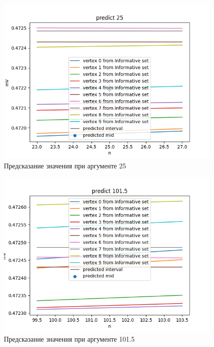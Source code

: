 \documentclass[a4paper,12pt]{article}
\begin{document}
\begin{figure}[H]
    \centering
    \includegraphics[width=12cm]{pics/predict25.png}
    \caption{Предсказание значения при аргументе 25}
    \label{fig:predict101.5}
\end{figure}

\begin{figure}[H]
    \centering
    \includegraphics[width=12cm]{pics/predict101.5.png}
    \caption{Предсказание значения при аргументе 101.5}
    \label{fig:predict-10}
\end{figure}
\end{document}
